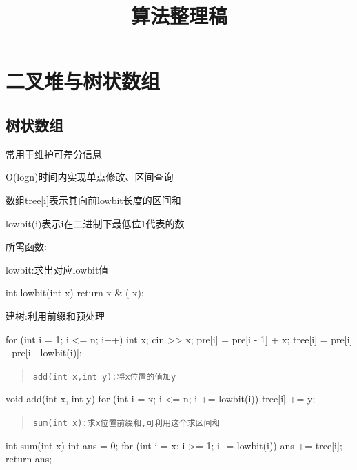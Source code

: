 \documentclass[UTF8,a4paper,11pt]{ctexart}
\title{算法整理稿}
\author{}
\date{}
\newcommand{\topic}[1]{%
  \par\needspace{3\baselineskip}\vspace{0.45em}%
  \noindent{\bfseries\color{Primary}#1}\par\vspace{0.12em}%
}
\begin{document}
\maketitle
\thispagestyle{empty}
\vspace{-2.1em}
\tableofcontents
\clearpage

\section{二叉堆与树状数组}

\subsection{树状数组}

\topic{基本性质}

常用于维护可差分信息

O(logn)时间内实现单点修改、区间查询

数组tree[i]表示其向前lowbit长度的区间和

\begin{CodeBlock}
lowbit(i)表示i在二进制下最低位1代表的数
\end{CodeBlock}

所需函数:

lowbit:求出对应lowbit值

\begin{CodeBlock}
int lowbit(int x) {
    return x & (-x);
}
\end{CodeBlock}

建树:利用前缀和预处理

\begin{CodeBlock}
for (int i = 1; i <= n; i++) {
    int x;
    cin >> x;
    pre[i] = pre[i - 1] + x;
    tree[i] = pre[i] - pre[i - lowbit(i)];
}
\end{CodeBlock}

\begin{quote}
\noindent\texttt{add(int x,int y):将x位置的值加y}
\end{quote}

\begin{CodeBlock}
void add(int x, int y) {
    for (int i = x; i <= n; i += lowbit(i))
        tree[i] += y;
}
\end{CodeBlock}

\begin{quote}
\noindent\texttt{sum(int x):求x位置前缀和,可利用这个求区间和}
\end{quote}

\begin{CodeBlock}
int sum(int x) {
    int ans = 0;
    for (int i = x; i >= 1; i -= lowbit(i))
        ans += tree[i];
    return ans;
}
\end{CodeBlock}
\end{document}
